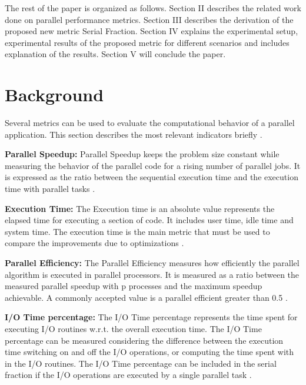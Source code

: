 The rest of the paper is organized as follows. Section II describes the related work done on parallel performance metrics. Section III  describes the derivation of the proposed new metric Serial Fraction. Section IV explains the experimental setup, experimental results of the proposed metric for different scenarios and includes explanation of the results. Section V will conclude the paper.

\section{Background}
Several metrics can be used to evaluate the computational behavior of a parallel application. This section describes the most relevant indicators briefly \cite{one, two}.


\textbf{Parallel    Speedup: } Parallel    Speedup   keeps the problem size constant while measuring    the    behavior    of    the    parallel    code    for    a    rising    number    of parallel    jobs. It is     expressed     as     the     ratio     between     the     sequential     execution     time and    the    execution    time    with parallel tasks \cite{WinNT}.

\textbf{Execution    Time: } The    Execution time    is an absolute value represents    the elapsed time for    executing    a    section    of    code.     It     includes user     time, idle     time and    system    time. The execution time     is     the main metric     that     must     be     used     to     compare     the
improvements    due    to    optimizations \cite{WinNT}.

\textbf{Parallel    Efficiency: } The     Parallel     Efficiency     measures     how     efficiently     the     parallel     algorithm     is     executed     in parallel processors. It    is    measured    as    a    ratio    between    the    measured    parallel    speedup    with p processes    and the    maximum    speedup    achievable. A    commonly    accepted    value    is    a parallel    efficient    greater    than    0.5 \cite{WinNT}.

\textbf{I/O    Time    percentage: } The    I/O    Time    percentage    represents    the    time    spent    for    executing    I/O    routines    w.r.t.    the overall    execution    time. The     I/O     Time     percentage     can     be     measured considering     the difference     between     the execution     time     switching     on     and     off     the     I/O     operations, or     computing     the     time     spent with in the I/O    routines.
The    I/O    Time percentage    can    be    included    in    the    serial    fraction    if    the    I/O operations are    executed    by    a    single    parallel    task \cite{WinNT}.

